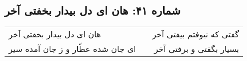 \begin{center}
\section*{شماره ۴۱: هان ای دل بیدار بخفتی آخر}
\label{sec:041}
\begin{longtable}{l p{0.5cm} r}
هان ای دل بیدار بخفتی آخر
&&
گفتی که نیوفتم بیفتی آخر
\\
ای جان شده عطّار و ز جان آمده سیر
&&
بسیار بگفتی و برفتی آخر
\\
\end{longtable}
\end{center}
